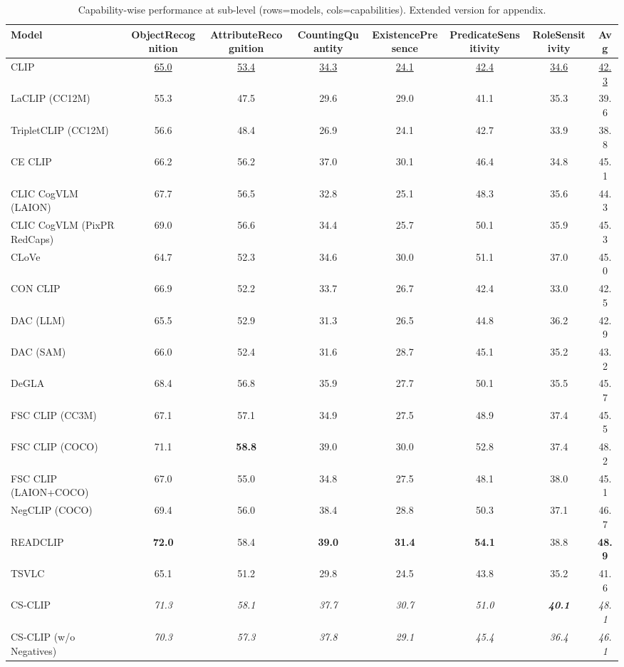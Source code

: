 \begin{table}[t]
  \centering
  \scriptsize
  \caption{Capability-wise performance at sub-level (rows=models, cols=capabilities). Extended version for appendix.}
  \label{tab:caps_sub_part1}
  \begin{adjustbox}{max width=\textwidth}
  \setlength{\tabcolsep}{2pt}
  \begin{tabular}{p{5.0cm}ccccccc}
    \toprule
    Model & ObjectRecognition & AttributeRecognition & CountingQuantity & ExistencePresence & PredicateSensitivity & RoleSensitivity & Avg \\
    \midrule
    CLIP & \underline{65.0} & \underline{53.4} & \underline{34.3} & \underline{24.1} & \underline{42.4} & \underline{34.6} & \underline{42.3} \\
    \midrule
    LaCLIP (CC12M) & 55.3 & 47.5 & 29.6 & 29.0 & 41.1 & 35.3 & 39.6 \\
    TripletCLIP (CC12M) & 56.6 & 48.4 & 26.9 & 24.1 & 42.7 & 33.9 & 38.8 \\
    \midrule
    CE CLIP & 66.2 & 56.2 & 37.0 & 30.1 & 46.4 & 34.8 & 45.1 \\
    CLIC CogVLM (LAION) & 67.7 & 56.5 & 32.8 & 25.1 & 48.3 & 35.6 & 44.3 \\
    CLIC CogVLM (PixPR RedCaps) & 69.0 & 56.6 & 34.4 & 25.7 & 50.1 & 35.9 & 45.3 \\
    CLoVe & 64.7 & 52.3 & 34.6 & 30.0 & 51.1 & 37.0 & 45.0 \\
    CON CLIP & 66.9 & 52.2 & 33.7 & 26.7 & 42.4 & 33.0 & 42.5 \\
    DAC (LLM) & 65.5 & 52.9 & 31.3 & 26.5 & 44.8 & 36.2 & 42.9 \\
    DAC (SAM) & 66.0 & 52.4 & 31.6 & 28.7 & 45.1 & 35.2 & 43.2 \\
    DeGLA & 68.4 & 56.8 & 35.9 & 27.7 & 50.1 & 35.5 & 45.7 \\
    FSC CLIP (CC3M) & 67.1 & 57.1 & 34.9 & 27.5 & 48.9 & 37.4 & 45.5 \\
    FSC CLIP (COCO) & 71.1 & \textbf{58.8} & 39.0 & 30.0 & 52.8 & 37.4 & 48.2 \\
    FSC CLIP (LAION+COCO) & 67.0 & 55.0 & 34.8 & 27.5 & 48.1 & 38.0 & 45.1 \\
    NegCLIP (COCO) & 69.4 & 56.0 & 38.4 & 28.8 & 50.3 & 37.1 & 46.7 \\
    READCLIP & \textbf{72.0} & 58.4 & \textbf{39.0} & \textbf{31.4} & \textbf{54.1} & 38.8 & \textbf{48.9} \\
    TSVLC & 65.1 & 51.2 & 29.8 & 24.5 & 43.8 & 35.2 & 41.6 \\
    \midrule
    CS-CLIP & \emph{71.3} & \emph{58.1} & \emph{37.7} & \emph{30.7} & \emph{51.0} & \textbf{\emph{40.1}} & \emph{48.1} \\
    CS-CLIP (w/o Negatives) & \emph{70.3} & \emph{57.3} & \emph{37.8} & \emph{29.1} & \emph{45.4} & \emph{36.4} & \emph{46.1} \\
    \bottomrule
  \end{tabular}
  \end{adjustbox}
\end{table}

